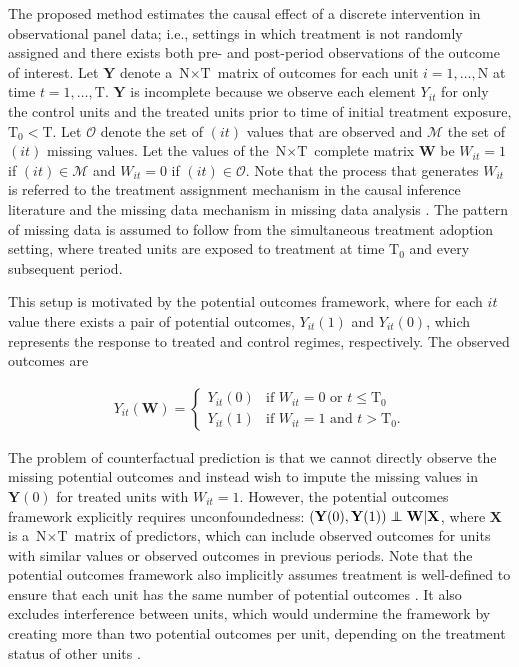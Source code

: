 \documentclass[hidelinks,12pt]{article}
\newcommand\independent{\protect\mathpalette{\protect\independenT}{\perp}}
\def\independenT#1#2{\mathrel{\rlap{$#1#2$}\mkern2mu{#1#2}}}
\begin{document}
The proposed method estimates the causal effect of a discrete intervention in observational panel data; i.e., settings in which treatment is not randomly assigned and there exists both pre- and post-period observations of the outcome of interest. Let $\mathbf{Y}$ denote a $\text{N} \times \text{T}$ matrix of outcomes for each unit $i =1, \ldots, \text{N}$ at time $t = 1, \ldots, \text{T}$. $\mathbf{Y}$ is incomplete because we observe each element $Y_{it}$ for only the control units and the treated units prior to time of initial treatment exposure, $\text{T}_0 < \text{T}$. Let $\mathcal{O}$ denote the set of $(it)$ values that are observed and $\mathcal{M}$ the set of $(it)$ missing values. Let the values of the $\text{N} \times \text{T}$ complete matrix $\mathbf{W}$ be $W_{it} =1$ if $(it) \in \mathcal{M}$ and $W_{it} = 0$ if $(it) \in \mathcal{O}$. Note that the process that generates $W_{it}$ is referred to the treatment assignment mechanism in the causal inference literature \citep{imbens2015causal} and the missing data mechanism in missing data analysis \citep{little2014}. The pattern of missing data is assumed to follow from the simultaneous treatment adoption setting, where treated units are exposed to treatment at time $\text{T}_0$ and every subsequent period. 

This setup is motivated by the \citet{neyman1923} potential outcomes framework, where for each $it$ value there exists a pair of potential outcomes, $Y_{it}(1)$ and $Y_{it}(0)$, which represents the response to treated and control regimes, respectively. The observed outcomes are 

\begin{align} 
Y_{it}(\mathbf{W}) = \begin{cases}
Y_{it}(0) 	& \mbox{if } W_{it} = 0  \text{ or } t \leq \text{T}_0 \\
Y_{it}(1) 	& \mbox{if } W_{it} = 1  \text{ and } t > \text{T}_0.
\end{cases} 
\end{align} 

The problem of counterfactual prediction is that we cannot directly observe the missing potential outcomes and instead wish to impute the missing values in $\mathbf{Y}(0)$ for treated units with $W_{it} =1$. However, the potential outcomes framework explicitly requires unconfoundedness: $(\mathbf{Y}(0), \mathbf{Y}(1)) \independent \mathbf{W}|\mathbf{X}$, where $\mathbf{X}$ is a $\text{N} \times \text{T}$ matrix of predictors, which can include observed outcomes for units with similar values or observed outcomes in previous periods. Note that the potential outcomes framework also implicitly assumes treatment is well-defined to ensure that each unit has the same number of potential outcomes \citep{imbens2015causal}. It also excludes interference between units, which would undermine the framework by creating more than two potential outcomes per unit, depending on the treatment status of other units \citep{rubin1990}.
\end{document}
